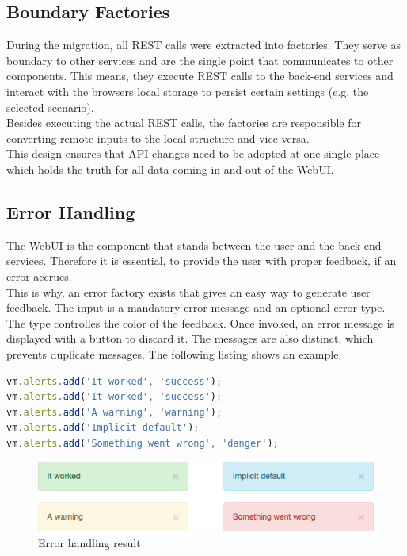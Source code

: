 \subsection{Boundary Factories}
During the migration, all REST calls were extracted into factories. They serve as boundary to other services and are the single point that communicates to other components. This means, they execute REST calls to the back-end services and interact with the browsers local storage to persist certain settings (e.g. the selected scenario).\\
Besides executing the actual REST calls, the factories are responsible for converting remote inputs to the local structure and vice versa.\\
This design ensures that API changes need to be adopted at one single place which holds the truth for all data coming in and out of the WebUI.


\subsection{Error Handling}
The WebUI is the component that stands between the user and the back-end services. Therefore it is essential, to provide the user with proper feedback, if an error accrues.\\
This is why, an error factory exists that gives an easy way to generate user feedback. The input is a mandatory error message and an optional error type. The type controlles the color of the feedback. Once invoked, an error message is displayed with a button to discard it. The messages are also distinct, which prevents duplicate messages. The following listing shows an example. 
\begin{lstlisting}[language=javascript, caption=Error handling]
vm.alerts.add('It worked', 'success');
vm.alerts.add('It worked', 'success');
vm.alerts.add('A warning', 'warning');
vm.alerts.add('Implicit default');
vm.alerts.add('Something went wrong', 'danger');
\end{lstlisting}
\begin{figure}[H]
	\centering\includegraphics[width=1\textwidth]{res/alerts}
	\caption{Error handling result}
\end{figure}


